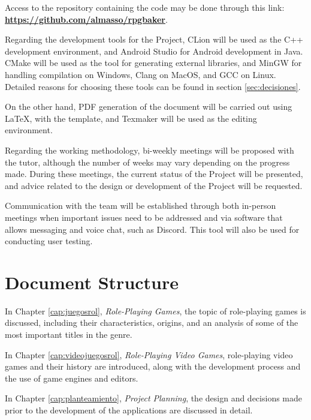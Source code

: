 \smallskip

Access to the repository containing the code may be done through this link: \href{https://github.com/almasso/rpgbaker}{\textbf{https://github.com/almasso/rpgbaker}}.

\medskip

Regarding the development tools for the Project, CLion will be used as the C++ development environment, and Android Studio for Android development in Java. CMake will be used as the tool for generating external libraries, and MinGW for handling compilation on Windows, Clang on MacOS, and GCC on Linux. Detailed reasons for choosing these tools can be found in section \ref{sec:decisiones}.

\medskip

On the other hand, PDF generation of the document will be carried out using \LaTeX, with the \texis template, and Texmaker will be used as the editing environment.

\bigskip

Regarding the working methodology, bi-weekly meetings will be proposed with the tutor, although the number of weeks may vary depending on the progress made. During these meetings, the current status of the Project will be presented, and advice related to the design or development of the Project will be requested.

\medskip

Communication with the team will be established through both in-person meetings when important issues need to be addressed and via software that allows messaging and voice chat, such as Discord. This tool will also be used for conducting user testing.

\section*{Document Structure} 
In Chapter \ref{cap:juegosrol}, \textit{Role-Playing Games}, the topic of role-playing games is discussed, including their characteristics, origins, and an analysis of some of the most important titles in the genre.

\medskip

In Chapter \ref{cap:videojuegosrol}, \textit{Role-Playing Video Games}, role-playing video games and their history are introduced, along with the development process and the use of game engines and editors.

\medskip

In Chapter \ref{cap:planteamiento}, \textit{Project Planning}, the design and decisions made prior to the development of the applications are discussed in detail.


